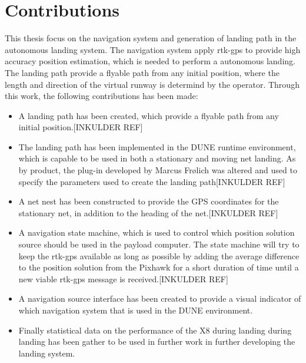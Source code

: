 \section{Contributions}
This thesis focus on the navigation system and generation of landing path in the autonomous landing system. The navigation system apply \gls{rtk-gps} to provide high accuracy position estimation, which is needed to perform a autonomous landing. The landing path provide a flyable path from any initial position, where the length and direction of the virtual runway is determind by the operator. Through this work, the following contributions has been made:
\begin{itemize}
\item A landing path has been created, which provide a flyable path from any initial position.[INKULDER REF]
\item The landing path has been implemented in the DUNE runtime environment, which is capable to be used in both a stationary and moving net landing. As by product, the plug-in developed by Marcus Frølich \citep{Froelich} was altered and used to specify the parameters used to create the landing path[INKULDER REF]
\item A net nest has been constructed to provide the GPS coordinates for the stationary net, in addition to the heading of the net.[INKULDER REF]
\item A navigation state machine, which is used to control which position solution source should be used in the payload computer. The state machine will try to keep the \gls{rtk-gps} available as long as possible by adding the average difference to the position solution from the Pixhawk for a short duration of time until a new viable \gls{rtk-gps} message is received.[INKULDER REF]
\item  A navigation source interface has been created to provide a visual indicator of which navigation system that is used in the DUNE environment.
\item Finally statistical data on the performance of the X8 during landing during landing has been gather to be used in further work in further developing the landing system.
\end{itemize}
\cleardoublepage